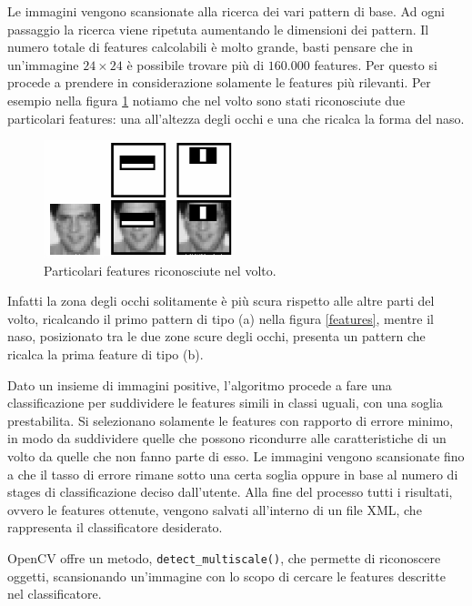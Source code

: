 \begin{itemize}
Le immagini vengono scansionate alla ricerca dei vari pattern di base. Ad ogni passaggio la ricerca viene ripetuta aumentando le dimensioni dei pattern. Il numero totale di features calcolabili è molto grande, basti pensare che in un'immagine $24\times 24$ è possibile trovare più di $160.000$ features. Per questo si procede a prendere in considerazione solamente le features più rilevanti.
Per esempio nella figura \ref{volti} notiamo che nel volto sono stati riconosciute due particolari features: una all'altezza degli occhi e una che ricalca la forma del naso.
\begin{figure}%
\centering
\includegraphics[width=0.5\textwidth]{images/openCV/haar.png}
\caption{Particolari features riconosciute nel volto.\label{volti}}
\end{figure}
Infatti la zona degli occhi solitamente è più scura rispetto alle altre parti del volto, ricalcando il primo pattern di tipo (a) nella figura \ref{features}, mentre il naso, posizionato tra le due zone scure degli occhi, presenta un pattern che ricalca la prima feature di tipo (b).

Dato un insieme di immagini positive, l'algoritmo procede a fare una classificazione per suddividere le features simili in classi uguali, con una soglia prestabilita. Si selezionano solamente le features con rapporto di errore minimo, in modo da suddividere quelle che possono ricondurre alle caratteristiche di un volto da quelle che non fanno parte di esso. Le immagini vengono scansionate fino a che il tasso di errore rimane sotto una certa soglia oppure in base al numero di stages di classificazione deciso dall'utente. Alla fine del processo tutti i risultati, ovvero le features ottenute, vengono salvati all'interno di un file XML, che rappresenta il classificatore desiderato.

OpenCV offre un metodo, \texttt{detect\_multiscale()}, che permette di riconoscere oggetti, scansionando un'immagine con lo scopo di cercare le features descritte nel classificatore. 


\end{itemize}
\clearpage